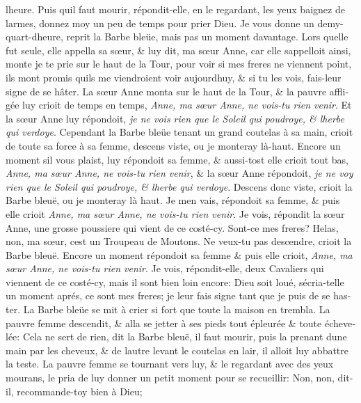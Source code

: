 \documentclass[14pt,a4paper]{memoir}
\begin{document}
\begin{otherlanguage}{french}
l\textquotesingle heure. Puis qu\textquotesingle il faut mourir,
répondit-elle, en le regardant, les yeux baignez de larmes, donnez moy
un peu de temps pour prier Dieu. Je vous donne un
demy-quart-d\textquotesingle heure, reprit la Barbe bleüe, mais pas un
moment davantage. Lors qu\textquotesingle elle fut seule, elle appella
sa sœur, \& luy dit, ma sœur Anne, car elle s\textquotesingle appelloit
ainsi, monte je te prie sur le haut de la Tour, pour voir si mes freres
ne viennent point, ils m\textquotesingle ont promis
qu\textquotesingle ils me viendroient voir aujourd\textquotesingle huy,
\& si tu les vois, fais-leur signe de se hâter. La sœur Anne monta sur
le haut de la Tour, \& la pauvre affligée luy crioit de temps en temps,
\emph{Anne, ma sœur Anne, ne vois-tu rien venir}. Et la sœur Anne luy
répondoit, \emph{je ne vois rien que le Soleil qui poudroye, \&
l\textquotesingle herbe qui verdoye}. Cependant la Barbe bleüe tenant un
grand coutelas à sa main, crioit de toute sa force à sa femme, descens
viste, ou je monteray là-haut. Encore un moment s\textquotesingle il
vous plaist, luy répondoit sa femme, \& aussi-tost elle crioit tout bas,
\emph{Anne, ma sœur Anne, ne vois-tu rien venir}, \& la sœur Anne
répondoit, \emph{je ne voy rien que le Soleil qui poudroye, \&
l\textquotesingle herbe qui verdoye}. Descens donc viste, crioit la
Barbe bleuë, ou je monteray là haut. Je m\textquotesingle en vais,
répondoit sa femme, \& puis elle crioit \emph{Anne, ma sœur Anne, ne
vois-tu rien venir}. Je vois, répondit la sœur Anne, une grosse
poussiere qui vient de ce costé-cy. Sont-ce mes freres? Helas, non, ma
sœur, c\textquotesingle est un Troupeau de Moutons. Ne veux-tu pas
descendre, crioit la Barbe bleuë. Encore un moment répondoit sa femme \&
puis elle crioit, \emph{Anne, ma sœur Anne, ne vois-tu rien venir}. Je
vois, répondit-elle, deux Cavaliers qui viennent de ce costé-cy, mais il
sont bien loin encore: Dieu soit loué,
s\textquotesingle écria-t\textquotesingle elle un moment aprés, ce sont
mes freres; je leur fais signe tant que je puis de se haster. La Barbe
bleüe se mit à crier si fort que toute la maison en trembla. La pauvre
femme descendit, \& alla se jetter à ses pieds tout épleurée \& toute
échevelée: Cela ne sert de rien, dit la Barbe bleuë, il faut mourir,
puis la prenant d\textquotesingle une main par les cheveux, \& de
l\textquotesingle autre levant le coutelas en l\textquotesingle air, il
alloit luy abbattre la teste. La pauvre femme se tournant vers luy, \&
le regardant avec des yeux mourans, le pria de luy donner un petit
moment pour se recueillir: Non, non, dit-il, recommande-toy bien à Dieu;

\end{otherlanguage}
\end{document}
